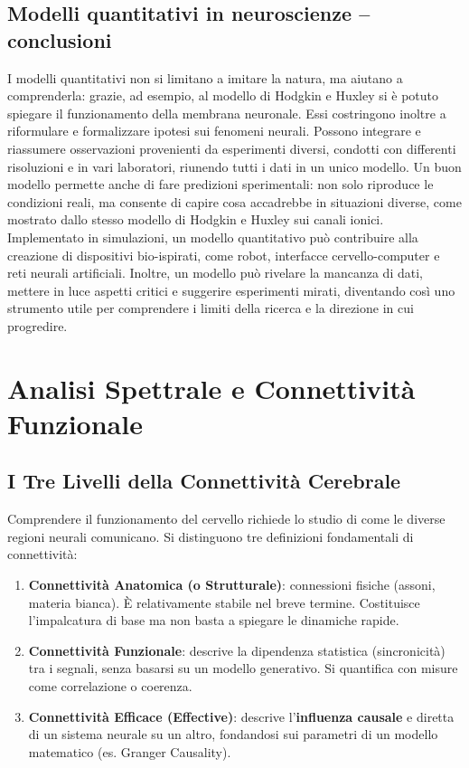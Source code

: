 \subsection{Modelli quantitativi in neuroscienze – conclusioni}
I modelli quantitativi non si limitano a imitare la natura, ma aiutano a comprenderla: grazie, ad esempio, al modello di Hodgkin e Huxley si è potuto spiegare il funzionamento della membrana neuronale. Essi costringono inoltre a riformulare e formalizzare ipotesi sui fenomeni neurali. Possono integrare e riassumere osservazioni provenienti da esperimenti diversi, condotti con differenti risoluzioni e in vari laboratori, riunendo tutti i dati in un unico modello. Un buon modello permette anche di fare predizioni sperimentali: non solo riproduce le condizioni reali, ma consente di capire cosa accadrebbe in situazioni diverse, come mostrato dallo stesso modello di Hodgkin e Huxley sui canali ionici. Implementato in simulazioni, un modello quantitativo può contribuire alla creazione di dispositivi bio-ispirati, come robot, interfacce cervello-computer e reti neurali artificiali. Inoltre, un modello può rivelare la mancanza di dati, mettere in luce aspetti critici e suggerire esperimenti mirati, diventando così uno strumento utile per comprendere i limiti della ricerca e la direzione in cui progredire.
\section{Analisi Spettrale e Connettività Funzionale}

\subsection{I Tre Livelli della Connettività Cerebrale}
Comprendere il funzionamento del cervello richiede lo studio di come le diverse regioni neurali comunicano. Si distinguono tre definizioni fondamentali di connettività:
\begin{enumerate}
    \item \textbf{Connettività Anatomica (o Strutturale)}: connessioni fisiche (assoni, materia bianca). È relativamente stabile nel breve termine. Costituisce l'impalcatura di base ma non basta a spiegare le dinamiche rapide.
    \item \textbf{Connettività Funzionale}: descrive la dipendenza statistica (sincronicità) tra i segnali, senza basarsi su un modello generativo. Si quantifica con misure come correlazione o coerenza.
    \item \textbf{Connettività Efficace (Effective)}: descrive l'\textbf{influenza causale} e diretta di un sistema neurale su un altro, fondandosi sui parametri di un modello matematico (es. Granger Causality).
\end{enumerate}

